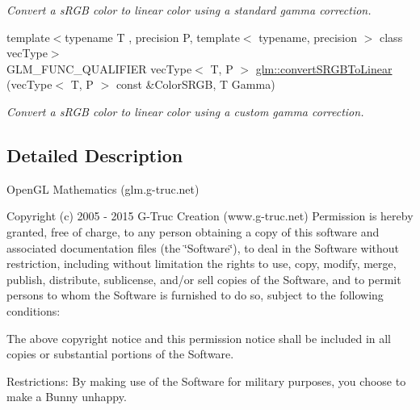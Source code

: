 \begin{DoxyCompactItemize}
\begin{DoxyCompactList}\small\item\em Convert a s\-R\-G\-B color to linear color using a standard gamma correction. \end{DoxyCompactList}\item 
\hypertarget{group__gtc__color__space_ga61c4f0efdf55c29d9cfbd26141fddef8}{{\footnotesize template$<$typename T , precision P, template$<$ typename, precision $>$ class vec\-Type$>$ }\\G\-L\-M\-\_\-\-F\-U\-N\-C\-\_\-\-Q\-U\-A\-L\-I\-F\-I\-E\-R vec\-Type$<$ T, P $>$ \hyperlink{group__gtc__color__space_ga61c4f0efdf55c29d9cfbd26141fddef8}{glm\-::convert\-S\-R\-G\-B\-To\-Linear} (vec\-Type$<$ T, P $>$ const \&Color\-S\-R\-G\-B, T Gamma)}\label{group__gtc__color__space_ga61c4f0efdf55c29d9cfbd26141fddef8}

\begin{DoxyCompactList}\small\item\em Convert a s\-R\-G\-B color to linear color using a custom gamma correction. \end{DoxyCompactList}\end{DoxyCompactItemize}


\subsection{Detailed Description}
Open\-G\-L Mathematics (glm.\-g-\/truc.\-net)

Copyright (c) 2005 -\/ 2015 G-\/\-Truc Creation (www.\-g-\/truc.\-net) Permission is hereby granted, free of charge, to any person obtaining a copy of this software and associated documentation files (the \char`\"{}\-Software\char`\"{}), to deal in the Software without restriction, including without limitation the rights to use, copy, modify, merge, publish, distribute, sublicense, and/or sell copies of the Software, and to permit persons to whom the Software is furnished to do so, subject to the following conditions\-:

The above copyright notice and this permission notice shall be included in all copies or substantial portions of the Software.

Restrictions\-: By making use of the Software for military purposes, you choose to make a Bunny unhappy.

